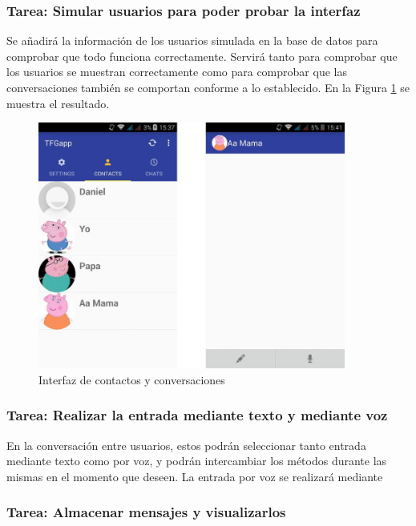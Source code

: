\subsubsection{Tarea: Simular usuarios para poder probar la interfaz}

Se añadirá la información de los usuarios simulada en la base de datos para comprobar que todo funciona correctamente. Servirá tanto para comprobar que los usuarios se muestran correctamente como para comprobar que las conversaciones también se comportan conforme a lo establecido. En la Figura \ref{fig:interfaz-contactos} se muestra el resultado.


\begin{figure}[!h]
\begin{center}
\includegraphics[width=0.9\textwidth]{./figures/interfaz-contactos.jpg}
\caption{Interfaz de contactos y conversaciones}
\label{fig:interfaz-contactos}
\end{center}
\end{figure}

\subsubsection{Tarea: Realizar la entrada mediante texto y mediante voz}

En la conversación entre usuarios, estos podrán seleccionar tanto entrada mediante texto como por voz, y podrán intercambiar los métodos durante las mismas en el momento que deseen. La entrada por voz se realizará mediante 


\subsubsection{Tarea: Almacenar mensajes y visualizarlos}

